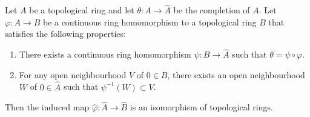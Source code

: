 \begin{lem}\label{l-common-comp}
Let $A$ be a topological ring and let $\theta:A \to \widehat A$ be the completion of $A$. 
Let $\varphi:A \to B$ be a continuous ring homomorphism 
to a topological ring $B$ that satisfies the following properties:  
\begin{enumerate}
\item There exists a continuous 
ring homomorphism $\psi:B \to \widehat{A}$ 
such that $\theta=\psi \circ \varphi$. 
\item For any open neighbourhood $V$ of $0 \in B$, 
there exists an open neighbourhood $W$ of $0 \in \widehat{A}$ such that $\psi^{-1}(W) \subset V$. 
\end{enumerate}
Then the induced map $\widehat{\varphi}:\widehat{A} \to \widehat{B}$ 
is an isomorphism of topological rings. 
\end{lem}

